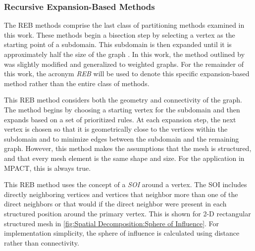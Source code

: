 {{{      \subsubsection{Recursive Expansion-Based Methods}{\label{sssec:Spatial Decomposition:Recursive Expansion-Based Methods}
        The \ac{REB} methods comprise the last class of partitioning methods examined in this work.
        These methods begin a bisection step by selecting a vertex as the starting point of a subdomain.
        This subdomain is then expanded until it is approximately half the size of the graph \cite{Farhat1988,Nasra1991,Elsner1997,Fitzgerald2017}.
        In this work, the method outlined by \citet{Fitzgerald2017} was slightly modified and generalized to weighted graphs.
        For the remainder of this work, the acronym \emph{\ac{REB}} will be used to denote this specific expansion-based method rather than the entire class of methods.

        This \ac{REB} method considers both the geometry and connectivity of the graph.
        The method begins by choosing a starting vertex for the subdomain and then expands based on a set of prioritized rules.
        At each expansion step, the next vertex is chosen so that it is geometrically close to the vertices within the subdomain and to minimize edges between the subdomain and the remaining graph.
        However, this method makes the assumptions that the mesh is structured, and that every mesh element is the same shape and size.
        For the application in MPACT, this is always true.

        This \ac{REB} method uses the concept of a \emph{\ac{SOI}} around a vertex.
        The \ac{SOI} includes directly neighboring vertices and vertices that neighbor more than one of the direct neighbors or that would if the direct neighbor were present in each structured position around the primary vertex.
        This is shown for 2-D rectangular structured mesh in \cref{fig:Spatial Decomposition:Sphere of Influence}.
        For implementation simplicity, the sphere of influence is calculated using distance rather than connectivity.

}}}}
